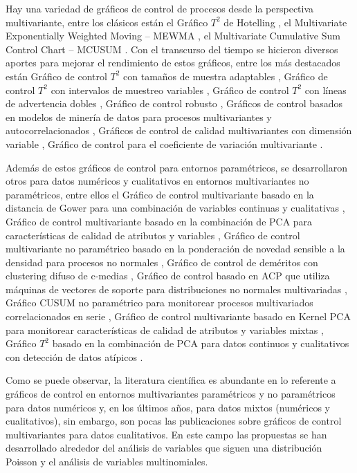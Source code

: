 \documentclass[water,article,submit,moreauthors,pdftex]{mdpi}
\begin{document}
Hay una variedad de gráficos de control de procesos desde la perspectiva
multivariante, entre los clásicos están el Gráfico \(T^2\) de Hotelling
\citep{hotelling1947}, el Multivariate Exponentially Weighted Moving --
MEWMA \citep{lowry1992}, el Multivariate Cumulative Sum Control Chart --
MCUSUM \citep{Crosier1988}. Con el transcurso del tiempo se hicieron
diversos aportes para mejorar el rendimiento de estos gráficos, entre
los más destacados están Gráfico de control \(T^2\) con tamaños de
muestra adaptables \citep{Aparisi1996}, Gráfico de control \(T^2\) con
intervalos de muestreo variables \citep{Aparisi2001}, Gráfico de control
\(T^2\) con líneas de advertencia dobles \citep{Faraz2006}, Gráfico de
control robusto \citep{shabbak2012}, Gráficos de control basados en
modelos de minería de datos para procesos multivariantes y
autocorrelacionados \citep{kim2012}, Gráficos de control de calidad
multivariantes con dimensión variable \citep{ruiz2013}, Gráfico de
control para el coeficiente de variación multivariante
\citep{yeong2016}.

Además de estos gráficos de control para entornos paramétricos, se
desarrollaron otros para datos numéricos y cualitativos en entornos
multivariantes no paramétricos, entre ellos el Gráfico de control
multivariante basado en la distancia de Gower para una combinación de
variables continuas y cualitativas \citep{Tuerhong2014}, Gráfico de
control multivariante basado en la combinación de PCA para
características de calidad de atributos y variables
\citep{Muhammad2018}, Gráfico de control multivariante no paramétrico
basado en la ponderación de novedad sensible a la densidad para procesos
no normales \citep{liu2020}, Gráfico de control de deméritos con
clustering difuso de c-medias \citep{yilmaz2020}, Gráfico de control
basado en ACP que utiliza máquinas de vectores de soporte para
distribuciones no normales multivariadas \citep{Farokhnia}, Gráfico
CUSUM no paramétrico para monitorear procesos multivariados
correlacionados en serie \citep{xue2020}, Gráfico de control
multivariante basado en Kernel PCA para monitorear características de
calidad de atributos y variables mixtas \citep{Ahsan2020}, Gráfico
\(T^2\) basado en la combinación de PCA para datos continuos y
cualitativos con detección de datos atípicos \citep{Ahsan2021}.

Como se puede observar, la literatura científica es abundante en lo
referente a gráficos de control en entornos multivariantes paramétricos
y no paramétricos para datos numéricos y, en los últimos años, para
datos mixtos (numéricos y cualitativos), sin embargo, son pocas las
publicaciones sobre gráficos de control multivariantes para datos
cualitativos. En este campo las propuestas se han desarrollado alrededor
del análisis de variables que siguen una distribución Poisson y el
análisis de variables multinomiales.
\end{document}
